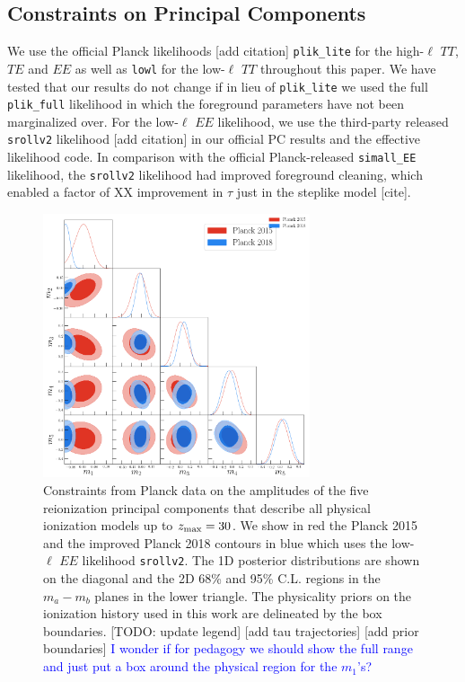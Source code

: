 \documentclass[prd,twocolumn,amsmath,amssymb,floatfix,superscriptaddress,nofootinbib]{revtex4-1}
\newcommand{\wh}[1]{\textcolor{blue}{#1}}
\begin{document}
\subsection{Constraints on Principal Components}
We use the official Planck likelihoods [add citation] \texttt{plik\_lite} for the high-$\ell$ $TT$, $TE$ and $EE$ as well as \texttt{lowl} for the low-$\ell$ $TT$ throughout this paper. We have tested that our results do not change if in lieu of \texttt{plik\_lite} we used the full \texttt{plik\_full} likelihood in which the foreground parameters have not been marginalized over. For the low-$\ell$ $EE$ likelihood, we use the third-party released \texttt{srollv2} likelihood [add citation] in our official PC results and the effective likelihood code. In comparison with the official Planck-released \texttt{simall\_EE} likelihood, the \texttt{srollv2} likelihood had improved foreground cleaning, which enabled a factor of XX improvement in $\tau$ just in the steplike model [cite].
\begin{figure}
\includegraphics[width=0.7\textwidth]{plots/plot_mj_triangle_t18_r12_t19_t20_vs_pl18_pc_zmax30_pliklite_srollv2_1015.png}
\caption{Constraints from Planck data on the amplitudes of the five reionization principal components that describe all physical ionization models up to $z_{\rm max} = 30$. We show in red the Planck 2015 and the improved Planck 2018 contours in blue which uses the low-$\ell$ $EE$ likelihood \texttt{srollv2}. The 1D posterior distributions are shown on the diagonal and the 2D 68\% and 95\% C.L. regions in the $m_a-m_b$ planes in the lower triangle. The physicality priors on the ionization history used in this work are delineated by the box boundaries. [TODO: update legend] [add tau trajectories] [add prior boundaries] \wh{I wonder if for pedagogy we should show the full range and just put a box around the physical region for the $m_1$'s?}}
\label{fig:plot_mjs_2018_vs_2015}
\end{figure}
\end{document}
